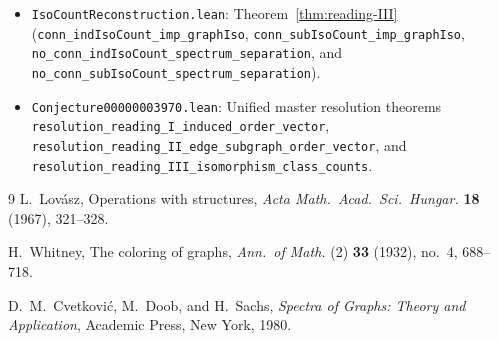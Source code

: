 \documentclass[11pt]{article}
\theoremstyle{definition}
\begin{document}
\begin{itemize}
  \item \texttt{IsoCountReconstruction.lean}: Theorem~\ref{thm:reading-III} (\texttt{conn\_\allowbreak indIsoCount\_\allowbreak imp\_\allowbreak graphIso}, \texttt{conn\_\allowbreak subIsoCount\_\allowbreak imp\_\allowbreak graphIso}, \texttt{no\_\allowbreak conn\_\allowbreak indIsoCount\_\allowbreak spectrum\_\allowbreak separation}, and \texttt{no\_\allowbreak conn\_\allowbreak subIsoCount\_\allowbreak spectrum\_\allowbreak separation}).
  \item \texttt{Conjecture00000003970.lean}: Unified master resolution theorems \texttt{resolution\_\allowbreak reading\_\allowbreak I\_\allowbreak induced\_\allowbreak order\_\allowbreak vector}, \texttt{resolution\_\allowbreak reading\_\allowbreak II\_\allowbreak edge\_\allowbreak subgraph\_\allowbreak order\_\allowbreak vector}, and \texttt{resolution\_\allowbreak reading\_\allowbreak III\_\allowbreak isomorphism\_\allowbreak class\_\allowbreak counts}.
\end{itemize}

\begin{thebibliography}{9}
L.~Lov\'asz, Operations with structures, \emph{Acta Math.\ Acad.\ Sci.\ Hungar.} \textbf{18} (1967), 321--328.

H.~Whitney, The coloring of graphs, \emph{Ann.\ of Math.} (2) \textbf{33} (1932), no.~4, 688--718.

D.~M.~Cvetkovi\'c, M.~Doob, and H.~Sachs, \emph{Spectra of Graphs: Theory and Application}, Academic Press, New York, 1980.
\end{thebibliography}
\end{document}
